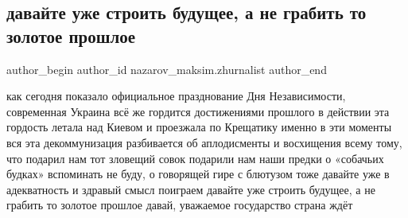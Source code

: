  
 
 
 
 
 
\subsection{давайте уже строить будущее, а не грабить то золотое прошлое}
\label{sec:24_08_2021.fb.nazarov_maksim.zhurnalist.1.parad_strana_proshloe_buduschee}
 
\ifcmt
 author_begin
   author_id nazarov_maksim.zhurnalist
 author_end
\fi

\obeycr
как сегодня показало официальное празднование Дня Независимости, современная Украина всё же гордится достижениями прошлого
в действии эта гордость летала над Киевом и проезжала по Крещатику
именно в эти моменты вся эта декоммунизация разбивается об аплодисменты и восхищения всему тому, что подарил нам тот зловещий совок  
подарили нам наши предки 
о «собачьих будках» вспоминать не буду, о говорящей гире с блютузом тоже  
давайте уже в адекватность и здравый смысл поиграем
давайте уже строить будущее, а не грабить то золотое прошлое 
давай, уважаемое государство 
страна ждёт
\restorecr
